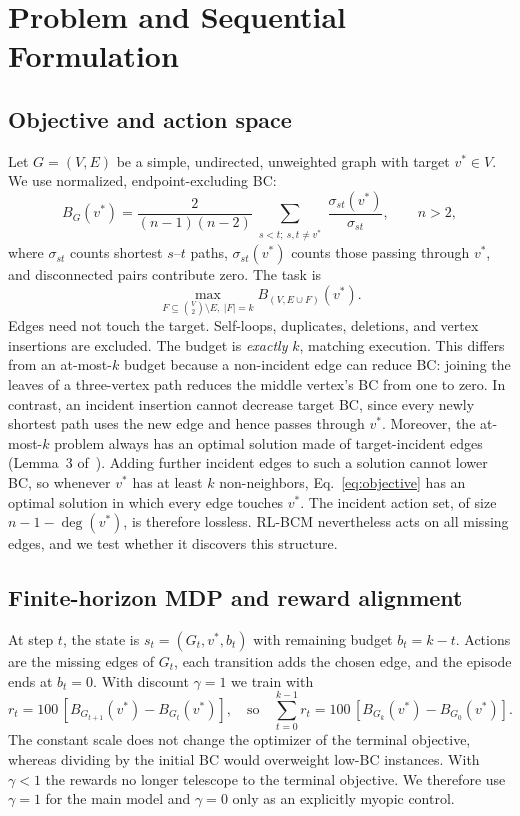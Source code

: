 \documentclass[runningheads]{llncs}
\newcommand{\rlbcm}{RL-BCM}
\begin{document}
\section{Problem and Sequential Formulation}
\label{sec:problem}
\subsection{Objective and action space}
Let $G=(V,E)$ be a simple, undirected, unweighted graph with target
$v^*\in V$. We use normalized, endpoint-excluding BC:
\begin{equation}
 B_G(v^*)=\frac{2}{(n-1)(n-2)}
 \sum_{\substack{s<t;\ s,t\ne v^*}}
 \frac{\sigma_{st}(v^*)}{\sigma_{st}},\qquad n>2,
 \label{eq:bc}
\end{equation}
where $\sigma_{st}$ counts shortest $s$--$t$ paths, $\sigma_{st}(v^*)$
counts those passing through $v^*$, and disconnected pairs contribute zero.
The task is
\begin{equation}
 \max_{F\subseteq {V\choose2}\setminus E,\ |F|=k} B_{(V,E\cup F)}(v^*).
 \label{eq:objective}
\end{equation}
Edges need not touch the target. Self-loops, duplicates, deletions, and
vertex insertions are excluded. The budget is \emph{exactly} $k$, matching
execution. This differs from an at-most-$k$ budget because a non-incident
edge can reduce BC: joining the leaves of a three-vertex path reduces the
middle vertex's BC from one to zero. In contrast, an incident insertion
cannot decrease target BC, since every newly shortest path uses the new
edge and hence passes through $v^*$. Moreover, the at-most-$k$ problem
always has an optimal solution made of target-incident edges (Lemma~3
of~\cite{Hoffmann2018}). Adding further incident edges to such a solution
cannot lower BC, so whenever $v^*$ has at least $k$ non-neighbors,
Eq.~\eqref{eq:objective} has an optimal solution in which every edge
touches $v^*$. The incident action set, of size $n-1-\deg(v^*)$, is
therefore lossless. \rlbcm{} nevertheless acts on all missing edges, and
we test whether it discovers this structure.

\subsection{Finite-horizon MDP and reward alignment}
At step $t$, the state is $s_t=(G_t,v^*,b_t)$ with remaining budget
$b_t=k-t$. Actions are the missing edges of $G_t$, each transition adds the
chosen edge, and the episode ends at $b_t=0$. With discount $\gamma=1$ we
train with
\begin{equation}
 r_t=100\,[B_{G_{t+1}}(v^*)-B_{G_t}(v^*)],
 \quad\text{so}\quad
 \sum_{t=0}^{k-1}r_t=100\,[B_{G_k}(v^*)-B_{G_0}(v^*)].
 \label{eq:reward}
\end{equation}
The constant scale does not change the optimizer of the terminal
objective, whereas dividing by the initial BC would overweight low-BC
instances. With $\gamma<1$ the rewards no longer telescope to the terminal
objective. We therefore use $\gamma=1$ for the main model and $\gamma=0$
only as an explicitly myopic control.
\end{document}
